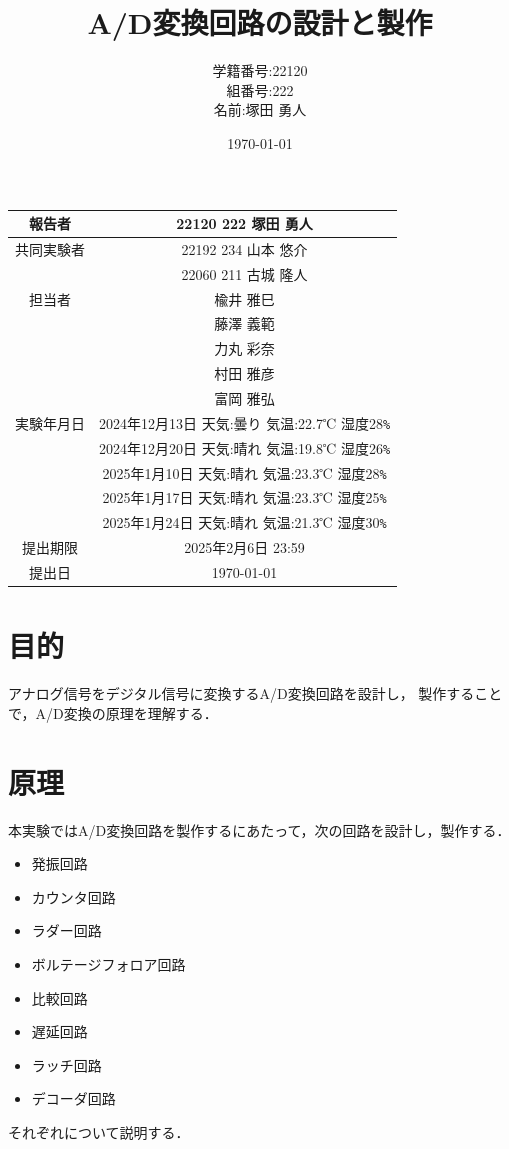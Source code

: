 \documentclass[a4paper,11pt,dvipdfmx]{jsarticle}
\begin{document}
\begin{table}[b]
  \centering
  \begin{tabular}{|c|c|}
    \hline
    報告者     & 22120 222 塚田 勇人 \\
    \hline
    共同実験者 & 22192 234 山本 悠介  \\ & 22060 211 古城 隆人\\
    \hline
    担当者     & 楡井 雅巳 \\
              &  藤澤 義範\\
    &力丸 彩奈\\
    &村田 雅彦\\
    &富岡 雅弘\\
    \hline
    実験年月日 & 2024年12月13日 天気:曇り 気温:22.7℃ 湿度28\verb#%#\\
    & 2024年12月20日 天気:晴れ 気温:19.8℃ 湿度26\verb#%#\\
    & 2025年1月10日 天気:晴れ 気温:23.3℃ 湿度28\verb#%#\\
    & 2025年1月17日 天気:晴れ 気温:23.3℃ 湿度25\verb#%#\\
    & 2025年1月24日 天気:晴れ 気温:21.3℃ 湿度30\verb#%#\\
    \hline
    提出期限   & 2025年2月6日 23:59  \\
    \hline
    提出日     & \today              \\
    \hline
  \end{tabular}
\end{table}

\title{A/D変換回路の設計と製作}
\author{学籍番号:22120 \\ 組番号:222 \\名前:塚田 勇人}
\date{\today}
\maketitle

\newpage

\section{目的}
アナログ信号をデジタル信号に変換するA/D変換回路を設計し，
製作することで，A/D変換の原理を理解する．

\section{原理}
本実験ではA/D変換回路を製作するにあたって，次の回路を設計し，製作する．
\begin{itemize}
  \item 発振回路
  \item カウンタ回路
  \item ラダー回路
  \item ボルテージフォロア回路
  \item 比較回路
  \item 遅延回路
  \item ラッチ回路
  \item デコーダ回路
\end{itemize}
それぞれについて説明する．
\end{document}
